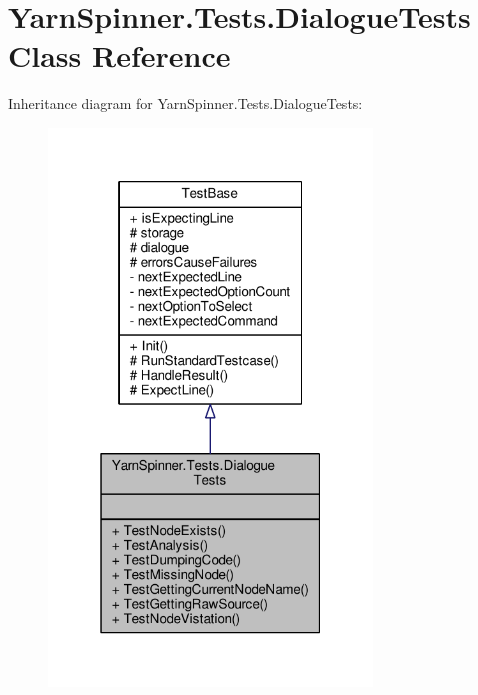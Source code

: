 \hypertarget{a00074}{\section{Yarn\-Spinner.\-Tests.\-Dialogue\-Tests Class Reference}
\label{a00074}
}


Inheritance diagram for Yarn\-Spinner.\-Tests.\-Dialogue\-Tests\-:
\nopagebreak
\begin{figure}[H]
\begin{center}
\leavevmode
\includegraphics[width=244pt]{d2/db1/a00730}
\end{center}
\end{figure}


